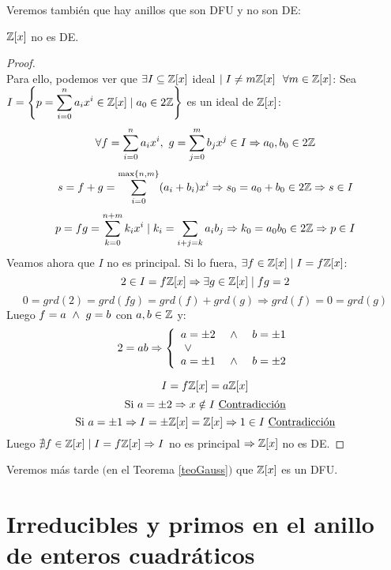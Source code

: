 Veremos también que hay anillos que son DFU y no son DE:
\begin{prop}
    $\mathbb Z[x]$ no es DE.
\begin{proof}
    \ \\
    Para ello, podemos ver que $\exists I \subseteq \mathbb Z[x]$ ideal $\mid I\neq m\mathbb Z[x]~~\forall m \in \mathbb Z[x]$:\newline
    Sea $\displaystyle I = \left\{p = \sum_{i=0}^n a_i x^i \in \mathbb Z[x] \mid a_0 \in 2\mathbb Z \right\}$ es un ideal de $\mathbb Z[x]$:
    $$\forall f = \sum_{i=0}^n a_i x^i, ~g=\sum_{j=0}^m b_j x^j \in I \Rightarrow a_0, b_0 \in 2\mathbb Z$$
    $$s=f+g = \sum_{i=0}^{\max\{n,m\}}(a_i+b_i) x^i \Rightarrow s_0 = a_0+b_0 \in 2\mathbb Z \Rightarrow s \in I$$
    $$p = fg = \sum_{k=0}^{n+m} k_i x^i \mid k_i = \sum_{i+j=k} a_i b_j \Rightarrow k_0 = a_0b_0 \in 2\mathbb Z \Rightarrow p \in I$$
    Veamos ahora que $I$ no es principal. Si lo fuera, $\exists f \in \mathbb Z[x] \mid I = f\mathbb Z[x]$:
    $$2 \in I=f\mathbb Z[x] \Rightarrow \exists g \in \mathbb Z[x] \mid fg = 2$$
    $$0 = grd(2) = grd(fg) = grd(f) + grd(g) \Rightarrow grd(f) = 0 = grd(g)$$
    Luego $f = a \ \land \  g=b$ con $a,b \in \mathbb Z$ y:
    $$2=ab \Rightarrow \left\{\begin{array}{lll}
            a = \pm 2 & \ \land \  & b = \pm 1 \\
            \ \lor \         &    &           \\
            a = \pm 1 & \ \land \  & b = \pm 2
        \end{array} \right.$$

    $$I = f\mathbb Z[x] = a\mathbb Z[x]$$
    $$\mbox{Si } a=\pm 2 \Rightarrow x \notin I \mbox{ \underline{Contradicción}}$$
    $$\mbox{Si } a=\pm 1 \Rightarrow I=\pm\mathbb Z[x] = \mathbb Z[x] \Rightarrow 1 \in I \mbox{ \underline{Contradicción}}$$
    Luego $\nexists f \in \mathbb Z[x] \mid I=f\mathbb Z[x] \Rightarrow I$ no es principal $\Rightarrow \mathbb Z[x]$ no es DE.
\end{proof}
\end{prop}

Veremos más tarde $($en el Teorema \ref{teoGauss}$)$ que $\mathbb Z[x]$ es un DFU.

\newpage
\section{Irreducibles y primos en el anillo de enteros cuadráticos}

